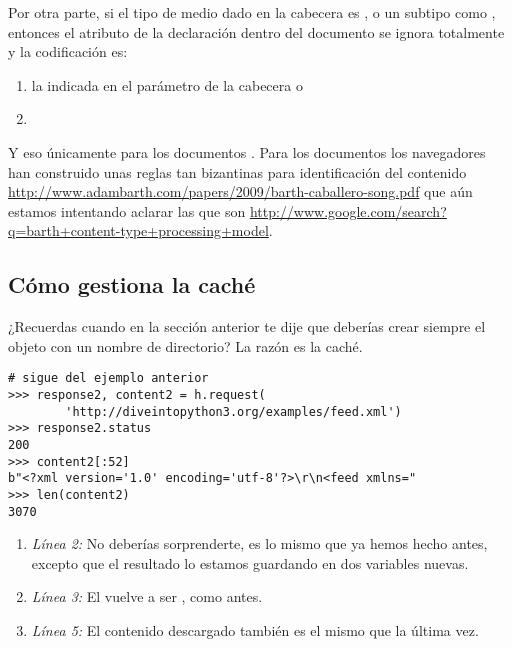 Por otra parte, si el tipo de medio dado en la cabecera  es ,  o un subtipo como , entonces el atributo  de la declaración dentro del documento  se ignora totalmente y la codificación es:

\begin{enumerate}

\item la indicada en el parámetro  de la cabecera  o

\item {}

\end{enumerate}

Y eso únicamente para los documentos . Para los documentos  los navegadores han construido unas reglas tan bizantinas para identificación del contenido \href{http://www.adambarth.com/papers/2009/barth-caballero-song.pdf}{http://www.adambarth.com/papers/2009/barth-caballero-song.pdf} que aún estamos intentando aclarar las que son \href{http://www.google.com/search?q=barth+content-type+processing+model}{http://www.google.com/search?q=barth+\allowbreak content-type+processing+model}.

\subsection{Cómo  gestiona la caché}

¿Recuerdas cuando en la sección anterior te dije que deberías crear siempre el objeto  con un nombre de directorio? La razón es la caché.

\noindent\begin{minipage}{\textwidth}
\begin{lstlisting}[mathescape=True]
# sigue del ejemplo anterior
>>> response2, content2 = h.request(
        'http://diveintopython3.org/examples/feed.xml') 
>>> response2.status                    
200
>>> content2[:52]                      
b"<?xml version='1.0' encoding='utf-8'?>\r\n<feed xmlns="
>>> len(content2)
3070
\end{lstlisting}
\end{minipage}

\begin{enumerate}

\item \emph{Línea 2:} No deberías sorprenderte, es lo mismo que ya hemos hecho antes, excepto que el resultado lo estamos guardando en dos variables nuevas.

\item \emph{Línea 3:} El  vuelve a ser , como antes.

\item \emph{Línea 5:} El contenido descargado también es el mismo que la última vez.

\end{enumerate}

